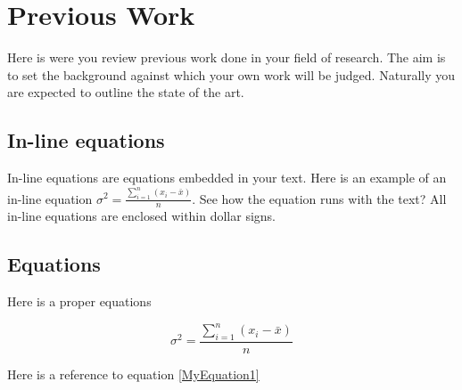 \section{Previous Work}

Here is were you review previous work done in your field of research. The aim is to set the background against which your own work will be judged. Naturally you are expected to outline the state of the art.

\subsection{In-line equations}

In-line equations are equations embedded in your text. Here is an example of an in-line equation $\sigma^2 = \frac{\sum\limits_{i=1}^{n} (x_i - \bar{x})}{n}$. See how the equation runs with the text? All in-line equations are enclosed within dollar signs.

\subsection{Equations}

Here is a proper equations

\begin{equation}
\sigma^2 = \frac{\sum\limits_{i=1}^{n} (x_i - \bar{x})}{n}
\label{MyEquation1}
\end{equation}

Here is a reference to equation \ref{MyEquation1}



